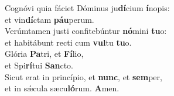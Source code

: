 \oddverse Cognóvi quia fáciet Dóminus ju\textbf{dí}cium \textbf{í}nopis:~\*\\
\oddverse et vin\textbf{dí}ctam \textbf{páu}perum.\\
\evenverse Verúmtamen justi confitebúntur \textbf{nó}mini \textbf{tu}o:~\*\\
\evenverse et habitábunt recti cum \textbf{vul}tu \textbf{tu}o.\\
\oddverse Glória \textbf{Pa}tri, et \textbf{Fí}lio,~\*\\
\oddverse et Spi\textbf{rí}tui \textbf{San}cto.\\
\evenverse Sicut erat in princípio, et \textbf{nunc}, et \textbf{sem}per,~\*\\
\evenverse et in sǽcula sæcu\textbf{ló}rum. \textbf{A}men.\\
